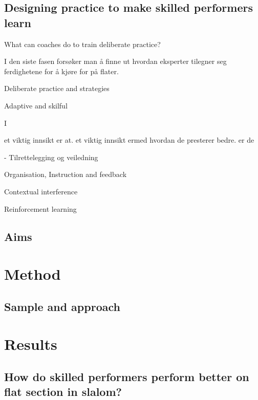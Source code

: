 \documentclass[letterpaper,10pt]{article}
\begin{document}
\subsection{Designing practice to make skilled performers learn}



What can coaches do to train deliberate practice?






I den siste fasen forsøker man å finne ut hvordan eksperter tilegner seg ferdighetene for å kjøre for på flater. 


Deliberate practice and strategies

Adaptive and skilful

I





et viktig innsikt er at. et viktig innsikt ermed hvordan de presterer bedre. er de


- Tilrettelegging og veiledning


Organisation, Instruction and feedback


Contextual interference





Reinforcement learning





\subsection{Aims}




\section{Method}

\subsection{Sample and approach}


\section{Results}


\subsection{How do skilled performers perform better on flat section in slalom?}
\end{document}
